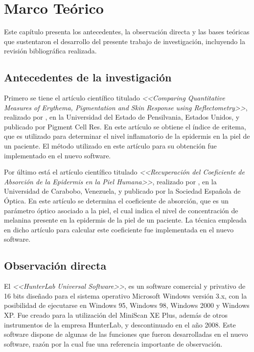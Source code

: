 \chapter{Marco Te\'{o}rico}

Este cap\'{i}tulo presenta los antecedentes, la observaci\'{o}n directa y las bases te\'{o}ricas que sustentaron el desarrollo del presente trabajo de investigaci\'{o}n, incluyendo la revisi\'{o}n bibliogr\'{a}fica realizada.

	\section{Antecedentes de la investigaci\'{o}n}	
			
			Primero se tiene el art\'{i}culo cient\'{i}fico titulado \textit{<<Comparing Quantitative Measures of Erythema, Pigmentation and Skin Response using Reflectometry>>}, realizado por \cite{Wagner}, en la Universidad del Estado de Pensilvania, Estados Unidos, y publicado por Pigment Cell Res. En este art\'{i}culo se obtiene el \'{i}ndice de eritema, que es utilizado para determinar el nivel inflamatorio de la epidermis en la piel de un paciente. El m\'{e}todo utilizado en este art\'{i}culo para su obtenci\'{o}n fue implementado en el nuevo software.
			
			Por	\'{u}ltimo est\'{a} el art\'{i}culo cient\'{i}fico titulado \textit{<<Recuperaci\'{o}n del Coeficiente de Absorci\'{o}n de la Epidermis en la Piel Humana>>}, realizado por \cite{Narea}, en la Universidad de Carabobo, Venezuela, y publicado por la Sociedad Espa\~{n}ola de \'{O}ptica. En este art\'{i}culo se determina el coeficiente de absorci\'{o}n, que es un par\'{a}metro \'{o}ptico asociado a la piel, el cual indica el nivel de concentraci\'{o}n de melanina presente en la epidermis de la piel de un paciente. La t\'{e}cnica empleada en dicho art\'{i}culo para calcular este coeficiente fue implementada en el nuevo software.

	\section{Observaci\'{o}n directa}
		
			El \textit{<<HunterLab Universal Software>>}, es un software comercial y privativo de 16 bits dise\~{n}ado para el sistema operativo Microsoft Windows versi\'{o}n 3.x, con la posibilidad de ejecutarse en Windows 95, Windows 98, Windows 2000 y Windows XP. Fue creado para la utilizaci\'{o}n del MiniScan XE Plus, adem\'{a}s de otros instrumentos de la empresa HunterLab, y descontinuado en el a\~{n}o 2008. Este software dispone de algunas de las funciones que fueron desarrolladas en el nuevo software, raz\'{o}n por la cual fue una referencia importante de observaci\'{o}n.

